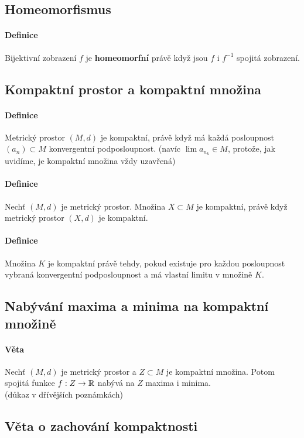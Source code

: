 \documentclass[a4paper,10pt]{article}
\begin{document}
\subsection{Homeomorfismus}
\setcounter{equation}{0}
\paragraph{Definice}
Bijektivní zobrazení $f$ je \textbf{homeomorfní} právě když jsou $f$ i $f^{-1}$
spojitá zobrazení.


\subsection{Kompaktní prostor a kompaktní množina}
\setcounter{equation}{0}
\paragraph{Definice} 
Metrický prostor $(M,d)$ je kompaktní, právě když má každá posloupnost $(a_n)
\subset M$ konvergentní podposloupnost. (navíc $\lim a_{n_k} \in M$, protože, jak uvidíme,
je kompaktní množina vždy uzavřená)
\paragraph{Definice}
Nechť $(M,d)$ je metrický prostor. Množina $X \subset M$ je kompaktní, právě když
metrický prostor $(X, d)$ je kompaktní. 
\paragraph{Definice}
Množina $K$ je kompaktní právě tehdy, pokud existuje pro každou posloupnost vybraná
konvergentní podposloupnost a má vlastní limitu v množině $K$.


\subsection{Nabývání maxima a minima na kompaktní množině}
\setcounter{equation}{0}
\paragraph{Věta}
Nechť $(M, d)$ je metrický prostor a $Z \subset M$ je kompaktní množina. Potom
spojitá funkce $f: Z \to \mathbb{R}$ nabývá na $Z$ maxima i minima.\\
(důkaz v dřívějších poznámkách)


\subsection{Věta o zachování kompaktnosti}
\setcounter{equation}{0}
\end{document}
